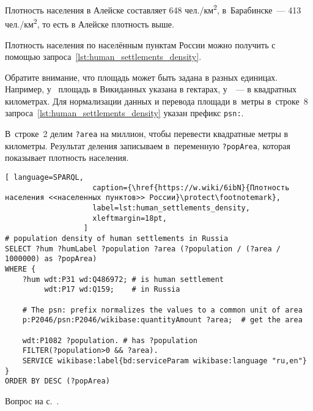 \begin{task}
\label{answer:human_settlements_density}
    Плотность населения в Алейске составляет 648 чел./км\textsuperscript{2}, 
        в~Барабинске~--- 413 чел./км\textsuperscript{2}, 
        то есть в Алейске плотность выше. 

        Плотность населения по населённым пунктам России можно получить 
        с помощью запроса~\ref{lst:human_settlements_density}. 

        Обратите внимание, что площадь может быть задана в разных единицах. 
        Например, у~ площадь в Викиданных указана в гектарах, 
        у~~--- в квадратных километрах. 
        Для нормализации данных и перевода площади в~метры в~строке~8 запроса~\ref{lst:human_settlements_density}
        указан префикс \lstinline|psn:|. 

        В~строке~2 делим \lstinline|?area| на миллион, чтобы перевести квадратные метры в километры. 
        Результат деления записываем в~переменную \lstinline|?popArea|, которая показывает плотность населения. 


\begin{lstlisting}[ language=SPARQL, 
                    caption={\href{https://w.wiki/6ibN}{Плотность населения <<населенных пунктов>> России}\protect\footnotemark},
                    label=lst:human_settlements_density,
                    xleftmargin=18pt, 
                  ]
# population density of human settlements in Russia
SELECT ?hum ?humLabel ?population ?area (?population / (?area / 1000000) as ?popArea) 
WHERE {
    ?hum wdt:P31 wd:Q486972; # is human settlement
         wdt:P17 wd:Q159;    # in Russia
       
    # The psn: prefix normalizes the values to a common unit of area
    p:P2046/psn:P2046/wikibase:quantityAmount ?area;  # get the area
       
    wdt:P1082 ?population. # has ?population
    FILTER(?population>0 && ?area).
    SERVICE wikibase:label{bd:serviceParam wikibase:language "ru,en"}
}
ORDER BY DESC (?popArea)
\end{lstlisting}

    \small{\AnswerBackref Вопрос на с.~\pageref{ch:human-settlement}.}
\end{task}



